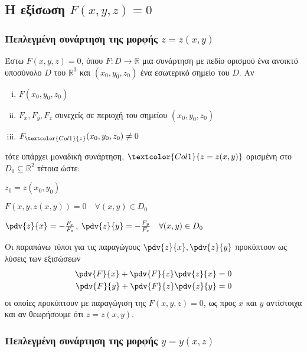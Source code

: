 \subsection{Η εξίσωση \ensuremath{F(x,y,z) = 0}}

\subsubsection{Πεπλεγμένη συνάρτηση της μορφής \ensuremath{z=z(x,y)}}

Έστω $ F(x,y,z) = 0 $, όπου $F\colon D \to \mathbb{R}$ μια συνάρτηση με πεδίο ορισμού 
ένα ανοικτό υποσύνολο $ D $ του $ \mathbb{R}^{3}  $ και $ (x_0,y_0,z_0) $ ένα 
εσωτερικό σημείο του $ D $. Αν
\begin{enumerate}[(i)]
  \item $ F(x_0,y_0,z_0) $
  \item $ F_x, F_y, F_z $ συνεχείς σε περιοχή του σημείου $ (x_0,y_0,z_0) $
  \item $ F_{\textcolor{Col1}{z}}(x_0,y_0,z_0) \neq 0 $
\end{enumerate}
τότε υπάρχει μοναδική συνάρτηση, $ \textcolor{Col1}{z=z(x,y)} $ ορισμένη στο 
$ D_0 \subseteq \mathbb{R}^{2} $ τέτοια ώστε:
\begin{myitemize}
  \item $ z_0 = z(x_0,y_0) $
  \item $ F(x,y,z(x,y)) = 0  \quad \forall (x,y)\in  D_0 $
  \item $ \pdv{z}{x} = - \frac{F_x}{F_z} $, $ \pdv{z}{y} = - \frac{F_y}{F_z}\quad 
    \forall (x,y) \in D_0$
\end{myitemize}

\begin{rem}
  Οι παραπάνω τύποι για τις παραγώγους $ \pdv{z}{x}, \pdv{z}{y} $ προκύπτουν 
  ως λύσεις των εξισώσεων  
  \begin{align*}	
    \pdv{F}{x} + \pdv{F}{z}\pdv{z}{x} &= 0 \\
    \pdv{F}{y} + \pdv{F}{z}\pdv{z}{y} &= 0 
  \end{align*}
  οι οποίες προκύπτουν με παραγώγιση της $ F(x,y,z) = 0 $, ως προς $x$ και $y$ 
  αντίστοιχα και  αν θεωρήσουμε ότι $ z=z(x,y) $.
\end{rem}

\subsubsection{Πεπλεγμένη συνάρτηση της μορφής \ensuremath{y=y(x,z)}}

